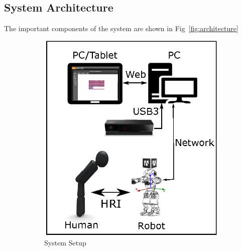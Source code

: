 \documentclass{llncs}
\begin{document}
\subsection{System Architecture}
The important components of the system are shown in Fig~\ref{fig:architecture}
\begin{figure}
\centering
\begin{subfigure}[t]{0.48\textwidth}
\includegraphics[width=\textwidth]{../thesis/assets/system_setup.eps}
\caption[System Setup]{System Setup}
\end{subfigure}
\begin{subfigure}[t]{0.48\textwidth}

\end{subfigure}
\end{figure}
\end{document}
